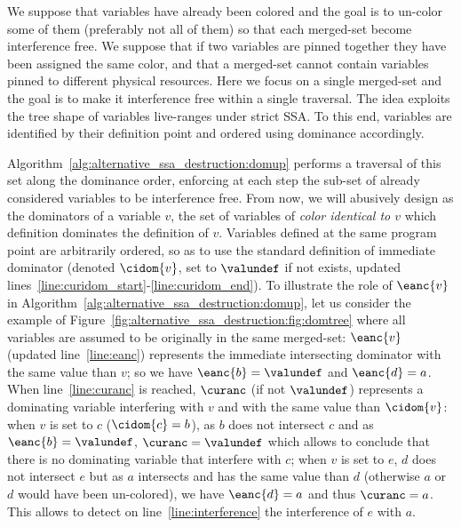 We suppose that variables have already been colored and the goal is to un-color some of them (preferably not all of them) so that each merged-set become interference free. 
We suppose that if two variables are pinned together they have been assigned the same color, and that a merged-set cannot contain variables pinned to different physical resources. 
Here we focus on a single merged-set and the goal is to make it interference free within a single traversal. 
The idea exploits the tree shape of variables live-ranges under strict SSA. 
To this end, variables are identified by their definition point and ordered using dominance accordingly.

Algorithm~\ref{alg:alternative_ssa_destruction:domup} performs a traversal of this set along the dominance order, enforcing at each step the sub-set of already considered variables to be interference free. 
From now, we will abusively design as the dominators of a variable $v$, the set of variables of \emph{color identical to $v$} which definition dominates the definition of $v$. 
Variables defined at the same program point are arbitrarily ordered, so as to use the standard definition of immediate dominator (denoted $\cidom{v}$, set to $\valundef$ if not exists, updated lines~\ref{line:curidom_start}-\ref{line:curidom_end}). 
To illustrate the role of $\eanc{v}$ in Algorithm~\ref{alg:alternative_ssa_destruction:domup}, let us consider the example of Figure~\ref{fig:alternative_ssa_destruction:fig:domtree} where all variables are assumed to be originally in the same merged-set: 
$\eanc{v}$ (updated line~\ref{line:eanc}) represents the immediate intersecting dominator with the same value than $v$; 
so we have $\eanc{b}=\valundef$ and $\eanc{d}=a$. 
When line~\ref{line:curanc} is reached, $\curanc$ (if not $\valundef$) represents a dominating variable interfering with $v$ and with the same value than $\cidom{v}$: 
when $v$ is set to $c$ ($\cidom{c}=b$), as $b$ does not intersect $c$ and as $\eanc{b}=\valundef$, $\curanc=\valundef$ which allows to conclude that there is no dominating variable that interfere with $c$; 
when $v$ is set to $e$, $d$ does not intersect $e$ but as $a$ intersects and has the same value than $d$ (otherwise $a$ or $d$ would have been un-colored), we have $\eanc{d}=a$ and thus $\curanc=a$. 
This allows to detect on line~\ref{line:interference} the interference of $e$ with $a$.

